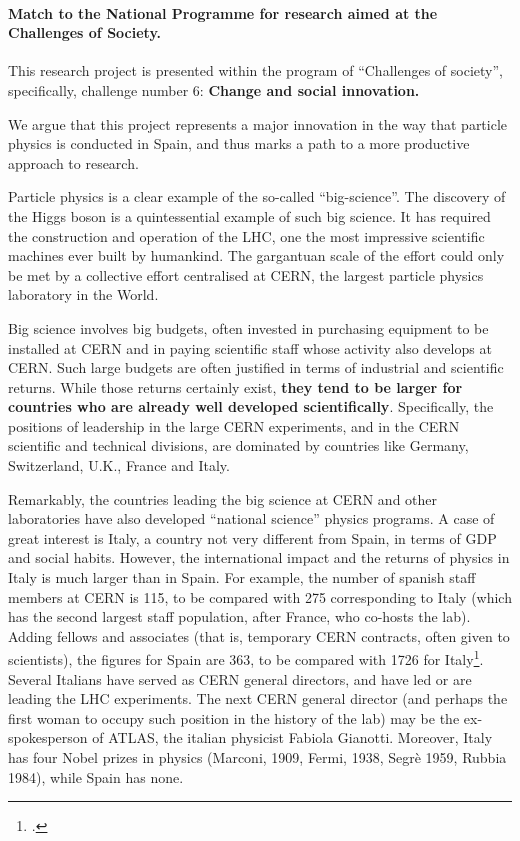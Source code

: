 \paragraph{Match to the National Programme for research aimed at the Challenges of Society.}
This research project is presented within the program of ``Challenges of society'', specifically, challenge number 6: {\bf Change and social innovation.}

We argue that this project represents a major innovation in the way that particle physics is conducted in Spain, and thus marks a path to a more productive approach to research.

Particle physics is a clear example of the so-called ``big-science''. The discovery of the Higgs boson is a quintessential example of such big science. It has required the construction and operation of the LHC, one the most impressive scientific machines ever built by humankind. The gargantuan scale of the effort could only be met by a collective effort centralised at CERN, the largest particle physics laboratory in the World.  

Big science involves big budgets, often invested in purchasing equipment to be installed at CERN and in paying scientific staff whose activity also develops at CERN. Such large budgets are often justified in terms of industrial and scientific returns. While those returns certainly exist, {\bf they tend to be larger for countries who are already well developed scientifically}. Specifically, the positions of leadership in the large CERN experiments, and in the CERN scientific and technical divisions, are dominated by countries like Germany, Switzerland, U.K., France and Italy. 

Remarkably, the countries leading the big science at CERN and other laboratories have also developed ``national science'' physics programs. A case of great interest is Italy, a country not very different from Spain, in terms of GDP and social habits. However, the international impact and the returns of physics in Italy is much larger than in Spain. For example, the number of spanish staff members at CERN is 115, to be compared with 275 corresponding to Italy (which has the second largest staff population, after France, who co-hosts the lab). Adding fellows and associates (that is, temporary CERN contracts, often given to scientists), the figures for Spain are 363, to be compared with 1726 for Italy\footcite{cernstats}. Several Italians have served as CERN general directors, and have led or are leading the LHC experiments. The next CERN general director (and perhaps the first woman to occupy such position in the history of the lab) may be the ex-spokesperson of ATLAS, the italian physicist Fabiola Gianotti. Moreover, Italy has four Nobel prizes in physics (Marconi, 1909, Fermi, 1938, Segrè 1959, Rubbia 1984), while Spain has none. 

